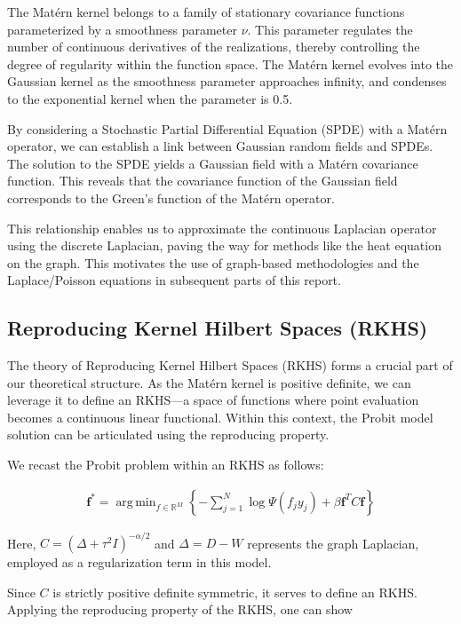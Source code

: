 \documentclass[11pt]{amsart}
\begin{document}
The Matérn kernel belongs to a family of stationary covariance functions parameterized by a smoothness parameter $\nu$. This parameter regulates the number of continuous derivatives of the realizations, thereby controlling the degree of regularity within the function space. The Matérn kernel evolves into the Gaussian kernel as the smoothness parameter approaches infinity, and condenses to the exponential kernel when the parameter is 0.5.

By considering a Stochastic Partial Differential Equation (SPDE) with a Matérn operator, we can establish a link between Gaussian random fields and SPDEs. The solution to the SPDE yields a Gaussian field with a Matérn covariance function. This reveals that the covariance function of the Gaussian field corresponds to the Green's function of the Matérn operator. \cite{sanzalonso2023}

This relationship enables us to approximate the continuous Laplacian operator using the discrete Laplacian, paving the way for methods like the heat equation on the graph. This motivates the use of graph-based methodologies and the Laplace/Poisson equations in subsequent parts of this report.

\subsection{Reproducing Kernel Hilbert Spaces (RKHS)}\label{sec:rkhs}

The theory of Reproducing Kernel Hilbert Spaces (RKHS) forms a crucial part of our theoretical structure. As the Matérn kernel is positive definite, we can leverage it to define an RKHS—a space of functions where point evaluation becomes a continuous linear functional. Within this context, the Probit model solution can be articulated using the reproducing property. \cite{amath563}

We recast the Probit problem within an RKHS as follows:

\begin{align*}
\mathbf f^* = \operatorname{arg\,min}_{f \in \mathbb R^M} \left\{ - \sum_{j=1}^N \log \Psi (f_j y_j) + \beta \mathbf f^T C \mathbf f \right\}
\end{align*}

Here, $C = \left( \Delta + \tau^2 I \right)^{-\alpha/2}$ and $\Delta = D - W$ represents the graph Laplacian, employed as a regularization term in this model.

Since $C$ is strictly positive definite symmetric, it serves to define an RKHS. Applying the reproducing property of the RKHS, one can show
\end{document}
